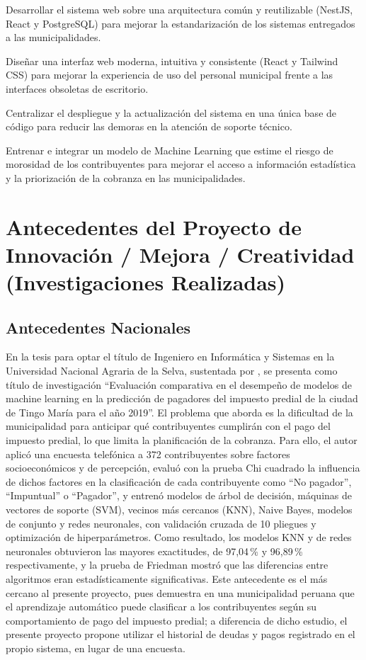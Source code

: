 \documentclass[12pt,a4paper]{report}
\begin{document}
\medskip
Desarrollar el sistema web sobre una arquitectura común y reutilizable (NestJS, React y PostgreSQL) para mejorar la estandarización de los sistemas entregados a las municipalidades.

\medskip
Diseñar una interfaz web moderna, intuitiva y consistente (React y Tailwind CSS) para mejorar la experiencia de uso del personal municipal frente a las interfaces obsoletas de escritorio.

\medskip
Centralizar el despliegue y la actualización del sistema en una única base de código para reducir las demoras en la atención de soporte técnico.

\medskip
Entrenar e integrar un modelo de Machine Learning que estime el riesgo de morosidad de los contribuyentes para mejorar el acceso a información estadística y la priorización de la cobranza en las municipalidades.

\section{Antecedentes del Proyecto de Innovación / Mejora / Creatividad (Investigaciones Realizadas)}

\subsection*{Antecedentes Nacionales}

En la tesis para optar el título de Ingeniero en Informática y Sistemas en la Universidad Nacional Agraria de la Selva, sustentada por \textcite{juncoaranciaga2023}, se presenta como título de investigación ``Evaluación comparativa en el desempeño de modelos de machine learning en la predicción de pagadores del impuesto predial de la ciudad de Tingo María para el año 2019''. El problema que aborda es la dificultad de la municipalidad para anticipar qué contribuyentes cumplirán con el pago del impuesto predial, lo que limita la planificación de la cobranza. Para ello, el autor aplicó una encuesta telefónica a 372 contribuyentes sobre factores socioeconómicos y de percepción, evaluó con la prueba Chi cuadrado la influencia de dichos factores en la clasificación de cada contribuyente como ``No pagador'', ``Impuntual'' o ``Pagador'', y entrenó modelos de árbol de decisión, máquinas de vectores de soporte (SVM), vecinos más cercanos (KNN), Naive Bayes, modelos de conjunto y redes neuronales, con validación cruzada de 10 pliegues y optimización de hiperparámetros. Como resultado, los modelos KNN y de redes neuronales obtuvieron las mayores exactitudes, de 97,04\,\% y 96,89\,\% respectivamente, y la prueba de Friedman mostró que las diferencias entre algoritmos eran estadísticamente significativas. Este antecedente es el más cercano al presente proyecto, pues demuestra en una municipalidad peruana que el aprendizaje automático puede clasificar a los contribuyentes según su comportamiento de pago del impuesto predial; a diferencia de dicho estudio, el presente proyecto propone utilizar el historial de deudas y pagos registrado en el propio sistema, en lugar de una encuesta.
\end{document}
